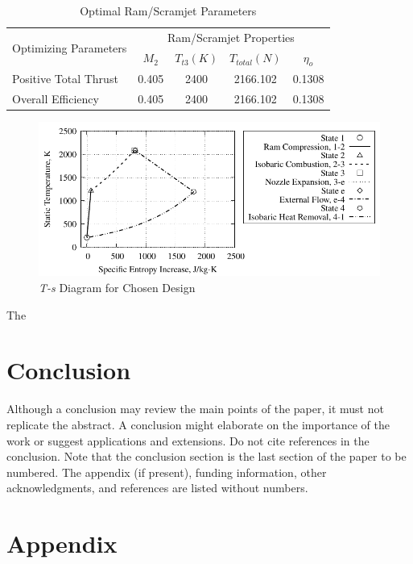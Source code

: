 \documentclass[conf]{new-aiaa} %
\begin{document}
\begin{table}[H] %
    \caption{\label{tab:design_propsys}Optimal Ram/Scramjet Parameters}
    \centering
    \begin{tabular}{lcccc}
        \hline
            \multirow{2}{*}{Optimizing Parameters}& \multicolumn{4}{c}{Ram/Scramjet Properties}\\
            & $M_2$& $T_{t3}(K)$& $T_{total}(N)$& $\eta_o$\\\hline
            Positive Total Thrust& 0.405& 2400& 2166.102& 0.1308\\
            Overall Efficiency& 0.405& 2400& 2166.102& 0.1308\\
        \hline
    \end{tabular}
\end{table}

\begin{figure}[H] %
    \centering
    \includegraphics[]{media/ts_plot_files/TS_plot_for_design.pdf}
    \caption{\label{fig:partits}\texorpdfstring{\textit{T-s}}{Ts} Diagram for Chosen Design}
\end{figure}
The


\section{Conclusion}
Although a conclusion may review the main points of the paper, it must not replicate the abstract. A conclusion might elaborate on the importance of the work or suggest applications and extensions. Do not cite references in the conclusion. Note that the conclusion section is the last section of the paper to be numbered. The appendix (if present), funding information, other acknowledgments, and references are listed without numbers.


\section*{Appendix}
\end{document}
